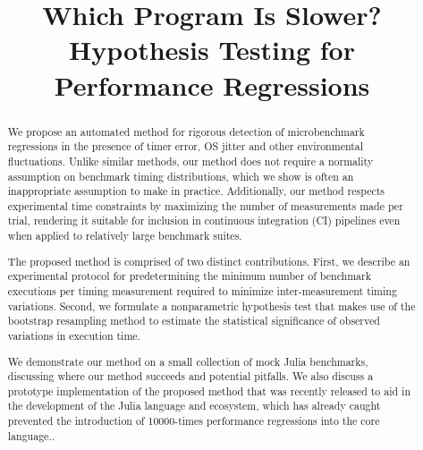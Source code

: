 \documentclass[conference]{IEEEtran}
\begin{document}
\newcommand{\TODO}[1]{\todo[inline]{#1}}
\newcommand{\TODOFIG}[1]{\missingfigure{#1}}

\title{Which Program Is Slower? Hypothesis Testing for Performance Regressions}

\author{
}

\maketitle

\begin{abstract}
We propose an automated method for rigorous detection of microbenchmark regressions in the
presence of timer error, OS jitter and other environmental fluctuations. Unlike similar
methods, our method does not require a normality assumption on benchmark timing
distributions, which we show is often an inappropriate assumption to make in practice.
Additionally, our method respects experimental time constraints by maximizing the number of
measurements made per trial, rendering it suitable for inclusion in continuous integration
(CI) pipelines even when applied to relatively large benchmark suites.

The proposed method is comprised of two distinct contributions. First, we describe an
experimental protocol for predetermining the minimum number of benchmark executions per
timing measurement required to minimize inter-measurement timing variations. Second, we
formulate a nonparametric hypothesis test that makes use of the bootstrap resampling method
to estimate the statistical significance of observed variations in execution time.

We demonstrate our method on a small collection of mock Julia benchmarks, discussing where
our method succeeds and potential pitfalls. We also discuss a prototype implementation of
the proposed method that was recently released to aid in the development of the Julia
language and ecosystem, which has already caught prevented the introduction of 10000-times
performance regressions into the core language.\TODO{cite Vararg PR}.
\end{abstract}
\end{document}
